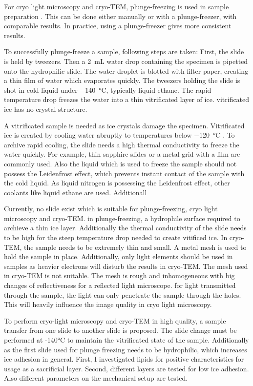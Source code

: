 For cryo light microscopy and cryo-TEM, plunge-freezing is used in sample preparation \cite{Danino.2012} \cite{Faoro.2018}. This can be done either manually or with a plunge-freezer, with comparable results. In practice, using a plunge-freezer gives more consistent results.

To successfully plunge-freeze a sample, following steps are taken: First, the slide is held by tweezers. Then a \SI{2}{\milli\liter} water drop containing the specimen is pipetted onto the hydrophilic slide. The water droplet is blotted with filter paper, creating a thin film of water which evaporates quickly. The tweezers holding the slide is shot in cold liquid under \SI{-140}{\degreeCelsius}, typically liquid ethane. The rapid temperature drop freezes the water into a thin vitrificated layer of ice. vitrificated ice has no crystal structure.

A vitrificated sample is needed as ice crystals damage the specimen. Vitrificated ice is created by cooling water abruptly to temperatures below \SI{-120}{\degreeCelsius} \cite{Wowk.2010}. To archive rapid cooling, the slide needs a high thermal conductivity to freeze the water quickly. For example, thin sapphire slides or a metal grid with a film are commonly used. Also the liquid which is used to freeze the sample should not possess the Leidenfrost effect, which prevents instant contact of the sample with the cold liquid. As liquid nitrogen is possessing the Leidenfrost effect, other coolants like liquid ethane are used. Additionall

Currently, no slide exist which is suitable for plunge-freezing, cryo light microscopy and cryo-TEM. in plunge-freezing, a hydrophile surface required to archieve a thin ice layer. Additionally the thermal conductivity of the slide needs to be high for the steep temperature drop needed to create vitificed ice. In cryo-TEM, the sample needs to be extremely thin and small. A metal mesh is used to hold the sample in place. Additionally, only light elements should be used in samples as heavier electrons will disturb the results in cryo-TEM. The mesh used in cryo-TEM is not suitable. The mesh is rough and inhomogeneous with big changes of reflectiveness for a reflected light microscope. for light transmitted through the sample, the light can only penetrate the sample through the holes. This will heavily influence the image quality in cryo light microscopy.
 
To perform cryo-light microscopy and cryo-TEM in high quality, a sample transfer from one slide to another slide is proposed. The slide change must be performed at -140°C to maintain the vitrificated state of the sample. Additionally as the first slide used for plunge freezing needs to be hydrophilic, which increases ice adhesion in general. First, I investigated lipids for positive characteristics for usage as a sacrificial layer. Second, different layers are tested for low ice adhesion. Also different parameters on the mechanical setup are tested.

